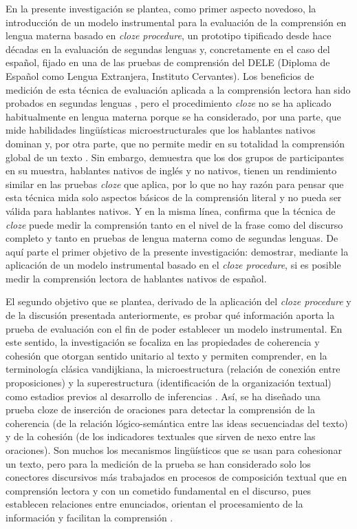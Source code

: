 \documentclass[spanish]{textolivre}
\begin{document}
En la presente investigación se plantea, como primer aspecto novedoso, la introducción de un modelo instrumental para la evaluación de la comprensión en lengua materna basado en \emph{cloze procedure}, un prototipo tipificado desde hace décadas en la evaluación de segundas lenguas \cite{oller_cloze_1973, sadeghi2021assessing} y, concretamente en el caso del español, fijado en una de las pruebas de comprensión del DELE (Diploma de Español como Lengua Extranjera, Instituto Cervantes). Los beneficios de medición de esta técnica de evaluación aplicada a la comprensión lectora han sido probados en segundas lenguas \cite{jonz_cloze_1991, felicecalzolari2022proceedings}, pero el procedimiento \emph{cloze} no se ha aplicado habitualmente en lengua materna porque se ha considerado, por una parte, que mide habilidades lingüísticas microestructurales que los hablantes nativos dominan y, por otra parte, que no permite medir en su totalidad la comprensión global de un texto \cite{grundin_cloze_1981}. Sin embargo, \textcite{alderson_native_1980} demuestra que los dos grupos de participantes en su muestra, hablantes nativos de inglés y no nativos, tienen un rendimiento similar en las pruebas \emph{cloze} que aplica, por lo que no hay razón para pensar que esta técnica mida solo aspectos básicos de la comprensión literal y no pueda ser válida para hablantes nativos. Y en la misma línea, \textcite{trace_clozing_2020} confirma que la técnica de \emph{cloze} puede medir la comprensión tanto en el nivel de la frase como del discurso completo y tanto en pruebas de lengua materna como de segundas lenguas. De aquí parte el primer objetivo de la presente investigación: demostrar, mediante la aplicación de un modelo instrumental basado en el \emph{cloze procedure}, si es posible medir la comprensión lectora de hablantes nativos de español. 

El segundo objetivo que se plantea, derivado de la aplicación del \emph{cloze procedure} y de la discusión presentada anteriormente, es probar qué información aporta la prueba de evaluación con el fin de poder establecer un modelo instrumental. En este sentido, la investigación se focaliza en las propiedades de coherencia y cohesión que otorgan sentido unitario al texto y permiten comprender, en la terminología clásica vandijkiana, la microestructura (relación de conexión entre proposiciones) y la superestructura (identificación de la organización textual) como estadios previos al desarrollo de inferencias \cite{echevarria2006ensenar}. Así, se ha diseñado una prueba cloze de inserción de oraciones para detectar la comprensión de la coherencia (de la relación lógico-semántica entre las ideas secuenciadas del texto) y de la cohesión (de los indicadores textuales que sirven de nexo entre las oraciones). Son muchos los mecanismos lingüísticos que se usan para cohesionar un texto, pero para la medición de la prueba se han considerado solo los conectores discursivos más trabajados en procesos de composición textual que en comprensión lectora y con un cometido fundamental en el discurso, pues establecen relaciones entre enunciados, orientan el procesamiento de la información y facilitan la comprensión \cite{martinbosque1999}.
\end{document}
